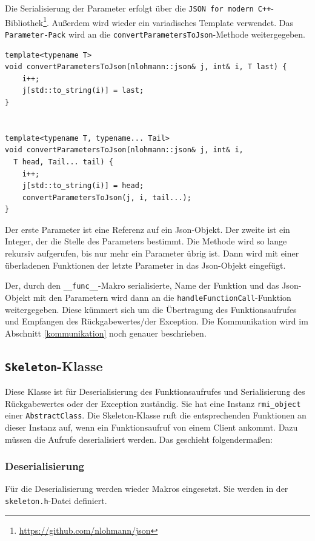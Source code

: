 \documentclass[a4paper,oneside,10pt]{report}
\begin{document}
Die Serialisierung der Parameter erfolgt über die \texttt{JSON for modern C++}-Bibliothek\footnote{\url{https://github.com/nlohmann/json}}. Außerdem wird wieder ein variadisches Template verwendet. Das \texttt{Parameter-Pack} wird an die \texttt{convertParametersToJson}-Methode weitergegeben. 

\begin{lstlisting}
template<typename T>
void convertParametersToJson(nlohmann::json& j, int& i, T last) {
    i++;
    j[std::to_string(i)] = last;
}


template<typename T, typename... Tail>
void convertParametersToJson(nlohmann::json& j, int& i, 
  T head, Tail... tail) {
    i++;
    j[std::to_string(i)] = head;
    convertParametersToJson(j, i, tail...);
}
\end{lstlisting}

Der erste Parameter ist eine Referenz auf ein Json-Objekt. Der zweite ist ein Integer, der die Stelle des Parameters bestimmt. Die Methode wird so lange rekursiv aufgerufen, bis nur mehr ein Parameter übrig ist. Dann wird mit einer überladenen Funktionen der letzte Parameter in das Json-Objekt eingefügt. 

Der, durch den \texttt{\_\_func\_\_}-Makro serialisierte, Name der Funktion und das Json-Objekt mit den Parametern wird dann an die \texttt{handleFunctionCall}-Funktion weitergegeben. Diese kümmert sich um die Übertragung des Funktionsaufrufes und Empfangen des Rückgabewertes/der Exception. Die Kommunikation wird im Abschnitt \ref{kommunikation} noch genauer beschrieben. 

\subsection{\texttt{Skeleton}-Klasse}

Diese Klasse ist für Deserialisierung des Funktionsaufrufes und Serialisierung des Rückgabewertes oder der Exception zuständig. Sie hat eine Instanz \texttt{rmi\_object} einer \texttt{AbstractClass}. Die Skeleton-Klasse ruft die entsprechenden Funktionen an dieser Instanz auf, wenn ein Funktionsaufruf von einem Client ankommt. Dazu müssen die Aufrufe deserialisiert werden. Das geschieht folgendermaßen:  

\subsubsection{Deserialisierung}

Für die Deserialisierung werden wieder Makros eingesetzt. Sie werden in der \texttt{skeleton.h}-Datei definiert. 
\end{document}
